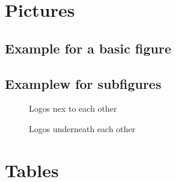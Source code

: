 
\Blinddocument
\chapter{Pictures}

	\section{Example for a basic figure}

	\Blindtext[1]
	\Blindtext[1]

	\section{Examplew for subfigures}
	\Blindtext[1]
	\begin{figure}[htb] %
		\caption{Logos nex to each other}
		\label{fig:logos1}
	\end{figure}

	\Blindtext[1]

	\begin{figure}[htb] %
		\caption{Logos underneath each other}
		\label{fig:logos2}
	\end{figure}

	\Blindtext[1]

\chapter{Tables}

